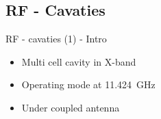 \documentclass{beamer}
\begin{document}
\subsection{RF - Cavaties}
\begin{frame}[t,fragile]{RF - cavaties (1) - Intro}
\begin{itemize}
\item Multi cell cavity in X-band
\item Operating mode at \SI{11.424}{\GHz}
\item Under coupled antenna
\end{itemize}

\begin{figure}
  \centering
  \quad
  \\
\end{figure}

\end{frame}
\end{document}
